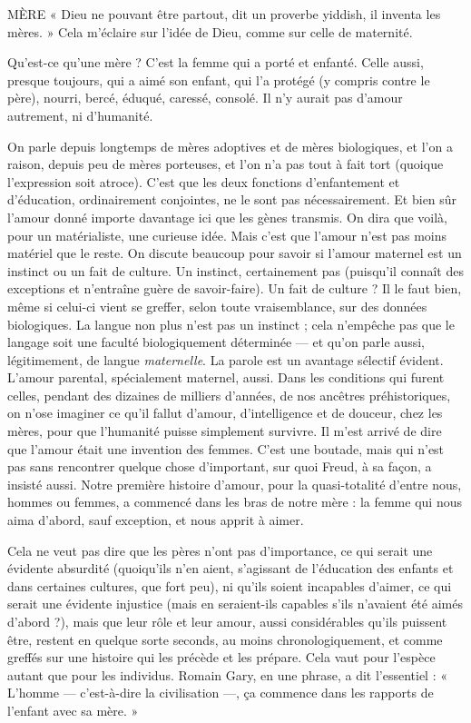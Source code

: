 MÈRE  « Dieu ne pouvant être partout, dit un proverbe yiddish, il inventa
les mères. » Cela m’éclaire sur l’idée de Dieu, comme sur celle de
maternité.

Qu'est-ce qu’une mère ? C’est la femme qui a porté et enfanté. Celle aussi,
presque toujours, qui a aimé son enfant, qui l’a protégé (y compris contre le
père), nourri, bercé, éduqué, caressé, consolé. Il n’y aurait pas d’amour autrement,
ni d'humanité.

On parle depuis longtemps de mères adoptives et de mères biologiques, et
l’on a raison, depuis peu de mères porteuses, et l’on n’a pas tout à fait tort
(quoique l’expression soit atroce). C’est que les deux fonctions d’enfantement
et d'éducation, ordinairement conjointes, ne le sont pas nécessairement. Et
bien sûr l’amour donné importe davantage ici que les gènes transmis. On dira
que voilà, pour un matérialiste, une curieuse idée. Mais c’est que l’amour n’est
pas moins matériel que le reste.
On discute beaucoup pour savoir si l’amour maternel est un instinct ou un
fait de culture. Un instinct, certainement pas (puisqu’il connaît des exceptions
et n’entraîne guère de savoir-faire). Un fait de culture ? Il le faut bien, même si
celui-ci vient se greffer, selon toute vraisemblance, sur des données biologiques.
La langue non plus n’est pas un instinct ; cela n'empêche pas que le langage soit
une faculté biologiquement déterminée — et qu’on parle aussi, légitimement, de
langue {\it maternelle}. La parole est un avantage sélectif évident. L'amour parental,
spécialement maternel, aussi. Dans les conditions qui furent celles, pendant des
dizaines de milliers d’années, de nos ancêtres préhistoriques, on n’ose imaginer
ce qu'il fallut d'amour, d’intelligence et de douceur, chez les mères, pour que
l'humanité puisse simplement survivre. Il m'est arrivé de dire que l’amour était
une invention des femmes. C’est une boutade, mais qui n’est pas sans rencontrer
quelque chose d’important, sur quoi Freud, à sa façon, a insisté aussi.
Notre première histoire d’amour, pour la quasi-totalité d’entre nous, hommes
ou femmes, a commencé dans les bras de notre mère : la femme qui nous aima
d’abord, sauf exception, et nous apprit à aimer.

Cela ne veut pas dire que les pères n’ont pas d'importance, ce qui serait une
évidente absurdité (quoiqu’ils n’en aient, s’agissant de l’éducation des enfants
et dans certaines cultures, que fort peu), ni qu’ils soient incapables d’aimer, ce
qui serait une évidente injustice (mais en seraient-ils capables s’ils n'avaient été
aimés d’abord ?), mais que leur rôle et leur amour, aussi considérables qu’ils
puissent être, restent en quelque sorte seconds, au moins chronologiquement,
et comme greffés sur une histoire qui les précède et les prépare. Cela vaut pour
l'espèce autant que pour les individus. Romain Gary, en une phrase, a dit
l'essentiel : « L'homme — c’est-à-dire la civilisation —, ça commence dans les
rapports de l'enfant avec sa mère. »

